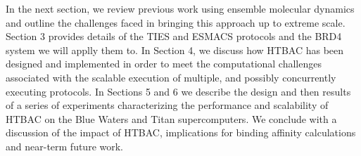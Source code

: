 In the next section, we review previous work using ensemble molecular dynamics and outline the challenges faced in bringing this approach up to 
extreme scale. 
Section 3 provides details of the TIES and ESMACS protocols and the BRD4 
system we will applly them to.
In Section 4, we discuss how HTBAC has been designed and implemented in
order to meet the computational challenges associated with the scalable
execution of multiple, and possibly concurrently executing protocols.  
In Sections 5 and 6 we describe
the design and then results of a series of experiments characterizing the
performance and scalability of HTBAC on the Blue Waters and Titan
supercomputers. 
We conclude with a discussion of the impact of HTBAC,
implications for binding affinity calculations and near-term future work.
